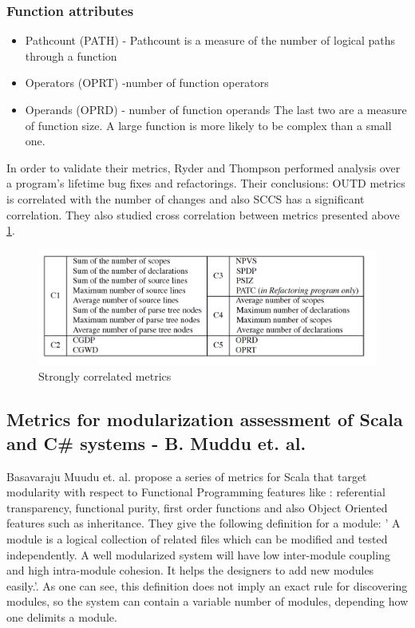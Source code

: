 \documentclass{article}
\begin{document}
\subsubsection{Function attributes}
\begin{itemize}
\item Pathcount (PATH) - Pathcount is a measure of the number of logical paths through a function
\item Operators (OPRT) -number of function operators
\item Operands (OPRD) - number of function operands \newline 
The last two are a measure of function size. A large function is more likely to be complex than a small one.
\end{itemize}

In order to validate their metrics, Ryder and Thompson performed analysis over a program's lifetime bug fixes and refactorings. Their conclusions: OUTD metrics is correlated with the number of changes and also SCCS has a significant correlation. They also studied cross correlation between metrics presented above \ref{fig:cross-correlation}.

\begin{figure}[h!]
  \includegraphics[width=\linewidth]{cross-correlation.png}
  \caption{Strongly correlated metrics}
  \label{fig:cross-correlation}
\end{figure}

\subsection{Metrics for modularization assessment of Scala and C\# systems - B. Muddu et. al.}
Basavaraju Muudu et. al. \cite{DBLP:conf/icse/MudduABP13} propose a series of metrics for Scala that target modularity with respect to Functional Programming features like : referential transparency, functional purity, first order functions and also Object Oriented features such as inheritance. They give the following definition for a module: ' A module is a logical collection of related files which can be modified and tested independently. A well modularized system will have low inter-module coupling and high intra-module cohesion. It helps the designers to add new modules easily.'\cite{DBLP:conf/icse/MudduABP13}. As one can see, this definition does not imply an exact rule for discovering  modules, so the system can contain a variable number of modules, depending how one delimits a module. \par
\end{document}
